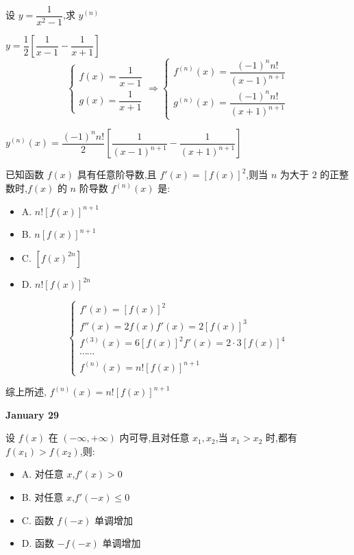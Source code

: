 \begin{example}[][Exam: 27.4.13]
	设 $y=\dfrac{1}{x^{2}-1}$,求 $y^{(n)}$
\end{example}

\begin{solution}

	$y = \dfrac{1}{2}\left[\dfrac{1}{x-1}-\dfrac{1}{x+1}\right]$
	$$\begin{cases} 
	f(x) = \dfrac{1}{x-1}\\
	g(x) =\dfrac{1}{x+1}
	\end{cases}\Rightarrow 
	\begin{cases}
	f^{(n)}(x) = \dfrac{(-1)^{n}n!}{(x-1)^{n+1}}\\
	g^{(n)}(x) = \dfrac{(-1)^{n}n!}{(x+1)^{n+1}}
	\end{cases}$$
	
	$y^{(n)}(x) = \dfrac{(-1)^{n}n!}{2}\left[\dfrac{1}{(x-1)^{n+1}}-\dfrac{1}{(x+1)^{n+1}}\right]$
\end{solution}

\begin{example}[][Exam: 27.4.14]
	已知函数 $f(x)$ 具有任意阶导数,且 $f'(x)=[f(x)]^{2}$,则当 $n$ 为大于 $2$ 的正整数时,$f(x)$ 的 $n$ 阶导数 $f^{(n)}(x)$ 是:
\begin{itemize}
	\item A. $n![f(x)]^{n+1}$
	\item B. $n[f(x)]^{n+1}$
	\item C. $[f(x)^{2n}]$
	\item D. $n![f(x)]^{2n}$
\end{itemize}
\end{example}

\begin{solution}

	$$\begin{cases}
	f'(x) = [f(x)]^{2}\\
	f''(x) = 2f(x)f'(x) = 2[f(x)]^{3}\\
	f^{(3)}(x) = 6[f(x)]^{2}f'(x) = 2\cdot 3[f(x)]^{4}\\
	\cdots\cdots\\
	f^{(n)}(x) = n![f(x)]^{n+1} 
	\end{cases}$$

	综上所述, $f^{(n)}(x) = n![f(x)]^{n+1}$
\end{solution}

\textcolor{purplea}{\textbf{January 29}}

\begin{example}[][Exam: 27.4.15]
	设 $f(x)$ 在 $(-\infty,+\infty)$ 内可导,且对任意 $x_{1},x_{2}$,当 $x_{1}>x_{2}$ 时,都有 $f(x_{1})>f(x_{2})$,则:
\begin{itemize}
	\item A. 对任意 $x$,$f'(x)>0$
	\item B. 对任意 $x$,$f'(-x)\leq 0$
	\item C. 函数 $f(-x)$ 单调增加
	\item D. 函数 $-f(-x)$ 单调增加
\end{itemize}
\end{example}

